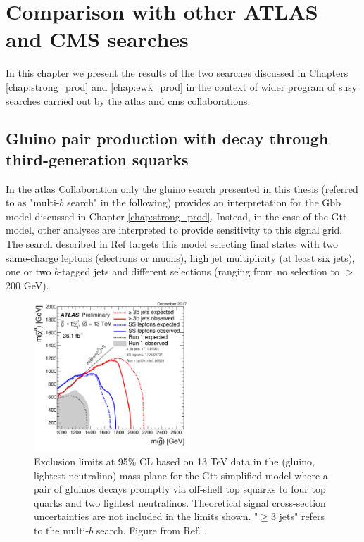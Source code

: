 \chapter{Comparison with other ATLAS and CMS searches}
\label{chap:summary_susy}

In this chapter we present the results of the two searches discussed in Chapters \ref{chap:strong_prod} and \ref{chap:ewk_prod} in the context of
wider program of \gls{susy} searches carried out by the \gls{atlas} and \gls{cms} collaborations. 

\section{Gluino pair production with decay through third-generation squarks}

In the \gls{atlas} Collaboration only the gluino search presented in this thesis (referred to as "multi-$b$ search" in the following) 
provides an interpretation for the Gbb model 
discussed in Chapter \ref{chap:strong_prod}.
Instead, in the case of the Gtt model, other analyses 
are interpreted to provide sensitivity  to this 
signal grid. 
The search described in Ref \cite{Aaboud:2017dmy} targets this model selecting final states with two same-charge 
leptons (electrons or muons), high jet multiplicity (at least six jets), one or two $b$-tagged jets and different \met selections 
(ranging from no \met selection to \met $>$ 200 GeV).

\begin{figure}[htbp]
	\centering
	\includegraphics[width=0.52\textwidth]{figures/summary_plots/ATLAS_SUSY_Gtt.pdf}
	\caption{Exclusion limits at 95\% CL based on 13 TeV data in the (gluino, lightest neutralino) 
	mass plane for the Gtt simplified model where a pair of gluinos decays promptly via off-shell top 
	squarks to four top quarks and two lightest neutralinos. Theoretical signal cross-section uncertainties are 
	not included in the limits shown. "$\geq 3$ jets" refers to the multi-$b$ search. Figure from Ref. \cite{atlasSUSYSummary}.
	} 
	\label{fig:summary_atlas_Gtt}
\end{figure}

